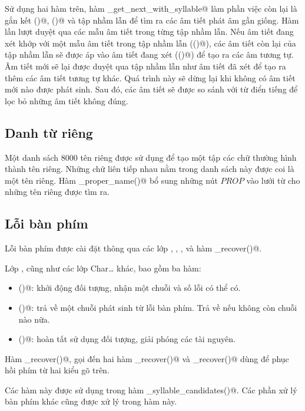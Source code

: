 \documentclass[a4paper,oneside,14pt]{extbook} %
\begin{document}
Sử dụng hai hàm trên, hàm
\verb@fuzzy_get_next_with_syllable@ làm phần việc còn
lại là gắn kết \verb@match()@, \verb@apply()@ và tập nhầm lẫn để tìm
ra các âm tiết phát âm gần giống. Hàm lần lượt duyệt qua các mẫu âm
tiết trong từng tập nhầm lẫn. Nếu âm tiết đang xét khớp với một mẫu âm
tiết trong tập nhầm lẫn (\verb@match()@), các âm tiết còn lại của tập
nhầm lẫn sẽ được áp vào âm tiết đang xét (\verb@apply()@) để tạo ra
các âm tương tự. Âm tiết mới sẽ lại được duyệt qua tập nhầm lẫn như âm
tiết đã xét để tạo ra thêm các âm tiết tương tự khác. Quá trình này sẽ
dừng lại khi không có âm tiết mới nào được phát sinh. Sau đó, các âm
tiết sẽ được so sánh với từ điển tiếng để lọc bỏ những âm tiết không
đúng.

\subsection{Danh từ riêng}

Một danh sách 8000 tên riêng được sử dụng để tạo một tập các chữ
thường hình thành tên riêng.
Những chữ liên tiếp nhau nằm trong danh sách này được coi là một tên
riêng. Hàm \verb@mark_proper_name()@ bổ sung những nút $PROP$ vào lưới
từ cho những tên riêng được tìm ra.

\subsection{Lỗi bàn phím}

Lỗi bàn phím được cài đặt thông qua các lớp \verb@KeyRecover@,
\verb@CharInserter@, \verb@CharEraser@, \verb@CharTransposer@ và
hàm \verb@im_recover()@.

Lớp \verb@KeyRecover@, cũng như các lớp Char\ldots{} khác, bao gồm ba hàm:
\begin{itemize}
\item \verb@init()@: khởi động đối tượng, nhận một chuỗi và số lỗi có
  thể có.
\item \verb@step()@: trả về một chuỗi phát sinh từ lỗi bàn phím. Trả
  về \verb@false@ nếu không còn chuỗi nào nữa.
\item \verb@done()@: hoàn tất sử dụng đối tượng, giải phóng các tài
  nguyên.
\end{itemize}

Hàm \verb@im_recover()@, gọi đến hai hàm \verb@vni_recover()@ và
\verb@telex_recover()@ dùng để phục hồi phím từ hai kiểu gõ trên.

Các hàm này được sử dụng trong hàm \verb@get_syllable_candidates()@.
Các phần xử lý bàn phím khác cũng được xử lý trong hàm này.
\end{document}
